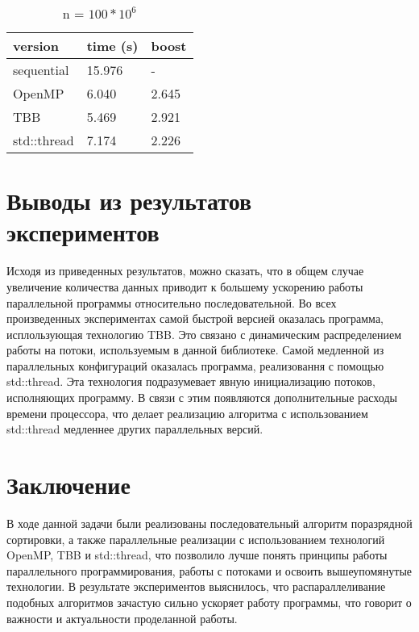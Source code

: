 \documentclass{report}
\begin{document}
\begin{table}[!h]
\centering
\begin{tabular}{| p{3cm} | p{3cm} | p{2cm} |}
\hline
version & time (s) & boost  \\[5pt]
\hline
sequential        & 15.976      & -  \\
OpenMP         & 6.040     & 2.645   \\
TBB        & 5.469      & 2.921   \\
std::thread        & 7.174     & 2.226   \\
\hline
\end{tabular}
\caption{n = $100 * 10^6$}
\end{table}

\newpage

\section*{Выводы из результатов экспериментов}
\par Исходя из приведенных результатов, можно сказать, что в общем случае увеличение количества данных приводит к большему ускорению работы параллельной программы относительно последовательной. Во всех произведенных экспериментах самой быстрой версией оказалась программа, исплользующая технологию TBB. Это связано с динамическим распределением работы на потоки, используемым в данной библиотеке. Самой медленной из параллельных конфигураций оказалась программа, реализовання с помощью std::thread. Эта технология подразумевает явную инициализацию потоков, исполняющих программу. В связи с этим появляются дополнительные расходы времени процессора, что делает реализацию алгоритма с использованием std::thread медленнее других параллельных версий.

\newpage

\section*{Заключение}
\par В ходе данной задачи были реализованы последовательный алгоритм поразрядной сортировки, а также параллельные реализации с использованием технологий OpenMP, TBB и std::thread, что позволило лучше понять принципы работы параллельного программирования, работы с потоками и освоить вышеупомянутые технологии. В результате экспериментов выяснилось, что распараллеливание подобных алгоритмов зачастую сильно ускоряет работу программы, что говорит о важности и актуальности проделанной работы.
\newpage
\end{document}
